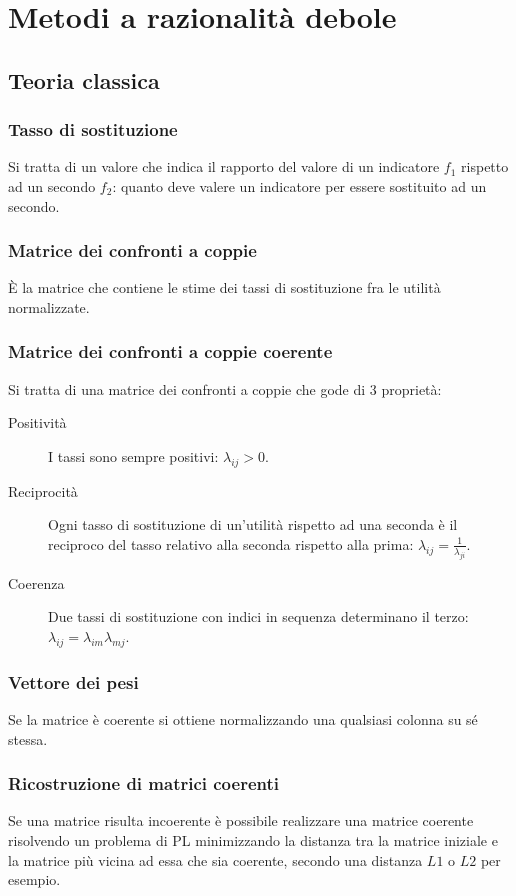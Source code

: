 \documentclass[\main/main.tex]{subfiles}
\begin{document}
\chapter{Metodi a razionalità debole}
\section{Teoria classica}
\subsection{Tasso di sostituzione}
Si tratta di un valore che indica il rapporto del valore di un indicatore $f_1$ rispetto ad un secondo $f_2$: quanto deve valere un indicatore per essere sostituito ad un secondo.

\subsection{Matrice dei confronti a coppie}
È la matrice che contiene le stime dei tassi di sostituzione fra le utilità normalizzate.

\subsection{Matrice dei confronti a coppie coerente}
Si tratta di una matrice dei confronti a coppie che gode di 3 proprietà:

\begin{description}
  \item[Positività] I tassi sono sempre positivi: $\lambda_{ij}>0$.
  \item[Reciprocità] Ogni tasso di sostituzione di un'utilità rispetto ad una seconda è il reciproco del tasso relativo alla seconda rispetto alla prima: $\lambda_{ij} = \frac{1}{\lambda_{ji}}$.
  \item[Coerenza] Due tassi di sostituzione con indici in sequenza determinano il terzo: $\lambda_{ij}=\lambda_{im}\lambda_{mj}$.
\end{description}

\subsection{Vettore dei pesi}
Se la matrice è coerente si ottiene normalizzando una qualsiasi colonna su sé stessa.

\subsection{Ricostruzione di matrici coerenti}
Se una matrice risulta incoerente è possibile realizzare una matrice coerente risolvendo un problema di PL minimizzando la distanza tra la matrice iniziale e la matrice più vicina ad essa che sia coerente, secondo una distanza $L1$ o $L2$ per esempio.
\end{document}
